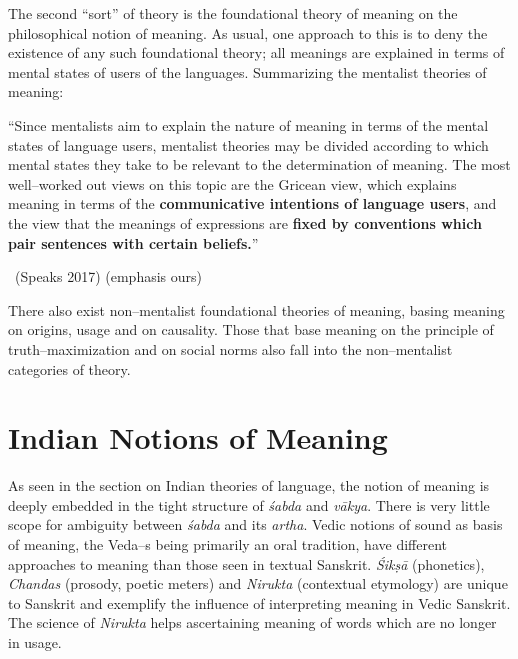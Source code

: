 The second “sort” of theory is the foundational theory of meaning on the philosophical notion of meaning. As usual, one approach to this is to deny the existence of any such foundational theory; all meanings are explained in terms of mental states of users of the languages. Summarizing the mentalist theories of meaning:

\begin{myquote}
“Since mentalists aim to explain the nature of meaning in terms of the mental states of language users, mentalist theories may be divided according to which mental states they take to be relevant to the determination of meaning. The most well–worked out views on this topic are the Gricean view, which explains meaning in terms of the \textbf{communicative intentions of language users}, and the view that the meanings of expressions are \textbf{fixed by conventions which pair sentences with certain beliefs.}”

~\hfill (Speaks 2017) (emphasis ours)
\end{myquote}

There also exist non–mentalist foundational theories of meaning, basing meaning on origins, usage and on causality. Those that base meaning on the principle of truth–maximization and on social norms also fall into the non–mentalist categories of theory.


\section*{Indian Notions of Meaning}

\vskip -5pt

As seen in the section on Indian theories of language, the notion of meaning is deeply embedded in the tight structure of \textit{śabda} and \textit{vākya}. There is very little scope for ambiguity between \textit{śabda} and its \textit{artha}. Vedic notions of sound as basis of meaning, the Veda–s being primarily an oral tradition, have different approaches to meaning than those seen in textual Sanskrit. \textit{Śikṣā} (phonetics), \textit{Chandas} (prosody, poetic meters) and \textit{Nirukta} (contextual etymology) are unique to Sanskrit and exemplify the influence of interpreting meaning in Vedic Sanskrit. The science of \textit{Nirukta} helps ascertaining meaning of words which are no longer in usage.

